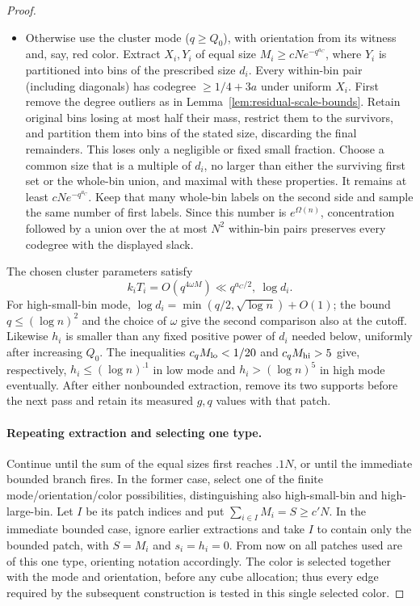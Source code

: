 \begin{proof}
\begin{itemize}
\item Otherwise use the cluster mode (\(q\ge Q_0\)), with orientation from its witness and, say, red color. Extract \(X_i,Y_i\) of equal size \(M_i\ge cN e^{-q^{a_C}}\), where \(Y_i\) is partitioned into bins of the prescribed size \(d_i\). Every within-bin pair (including diagonals) has codegree \(\ge1/4+3a\) under uniform \(X_i\). First remove the degree outliers as in Lemma~\ref{lem:residual-scale-bounds}. Retain original bins losing at most half their mass, restrict them to the survivors, and partition them into bins of the stated size, discarding the final remainders. This loses only a negligible or fixed small fraction. Choose a common size that is a multiple of \(d_i\), no larger than either the surviving first set or the whole-bin union, and maximal with these properties. It remains at least \(cNe^{-q^{a_C}}\). Keep that many whole-bin labels on the second side and sample the same number of first labels. Since this number is \(e^{\Omega(n)}\), concentration followed by a union over the at most \(N^2\) within-bin pairs preserves every codegree with the displayed slack.
\end{itemize}

The chosen cluster parameters satisfy
\[
 k_iT_i=O(q^{4\omega M})\ll q^{a_C/2},\ \log d_i.
\]
For high-small-bin mode, \(\log d_i=\min(q/2,\sqrt{\log n})+O(1)\); the bound \(q\le(\log n)^2\) and the choice of \(\omega\) give the second comparison also at the cutoff. Likewise \(h_i\) is smaller than any fixed positive power of \(d_i\) needed below, uniformly after increasing \(Q_0\). The inequalities \(c_qM_{\rm lo}<1/20\) and \(c_qM_{\rm hi}>5\) give, respectively, \(h_i\le(\log n)^{.1}\) in low mode and \(h_i>(\log n)^5\) in high mode eventually. After either nonbounded extraction, remove its two supports before the next pass and retain its measured \(g,q\) values with that patch.

\paragraph{Repeating extraction and selecting one type.}
Continue until the sum of the equal sizes first reaches \(.1N\), or until
the immediate bounded branch fires. In the former case, select one of the
finite mode/orientation/color possibilities, distinguishing also
high-small-bin and high-large-bin. Let \(I\) be its patch indices and put
\(\sum_{i\in I}M_i=S\ge c'N\). In the immediate bounded case, ignore
earlier extractions and take \(I\) to contain only the bounded patch, with
\(S=M_i\) and \(s_i=h_i=0\). From now on all patches used are of this one
type, orienting notation accordingly. The color is selected together with
the mode and orientation, before any cube allocation; thus every edge
required by the subsequent construction is tested in this single selected
color.


\end{proof}
